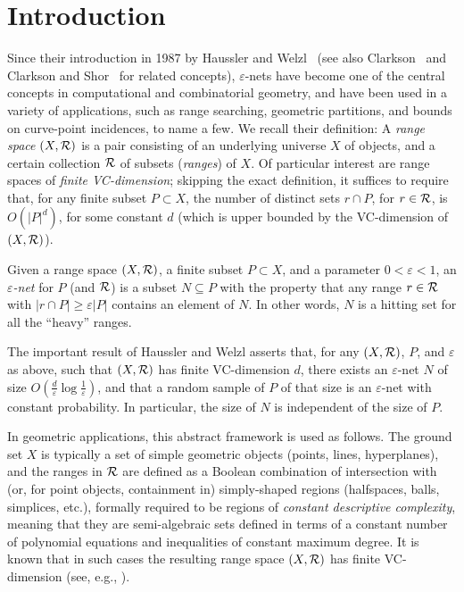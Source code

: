 \documentclass[12pt]{article}
\newcommand{\eps}{{\varepsilon}}
\def\R{{\cal R}}
\begin{document}
\section{Introduction}

Since their introduction in 1987 by Haussler and
Welzl~\cite{hw-ensrq-87} (see also Clarkson~\cite{c-narsc-87} and
Clarkson and Shor~\cite{cs-arscg-89} for related concepts),
$\eps$-nets have become one of the central concepts in computational
and combinatorial geometry, and have been used in a variety of
applications, such as range searching, geometric partitions, and
bounds on curve-point incidences, to name a few. We recall their
definition: A {\em range space} $(X,\R)$ is a pair consisting of an
underlying universe $X$ of objects, and a certain collection $\R$ of
subsets ({\em ranges}) of $X$. Of particular interest are range spaces
of {\em finite VC-dimension}; skipping the exact definition, it
suffices to require that, for any finite subset $P\subset X$, the
number of distinct sets $r\cap P$, for $r\in\R$, is $O(|P|^d)$, for
some constant $d$ (which is upper bounded by the VC-dimension of
$(X,\R)$).

Given a range space $(X,\R)$, a finite subset $P\subset X$, and a
parameter $0<\eps<1$, an {\em $\eps$-net} for $P$ (and $\R$) is a
subset $N\subseteq P$ with the property that any range $r\in\R$ with
$|r\cap P|\ge \eps|P|$ contains an element of $N$. In other words, $N$
is a hitting set for all the ``heavy'' ranges.

The important result of Haussler and Welzl asserts that, for any
$(X,\R)$, $P$, and $\eps$ as above, such that $(X,\R)$ has finite
VC-dimension $d$, there exists an $\eps$-net $N$ of size
$O\left(\frac{d}{\eps}\log\frac{1}{\eps}\right)$, and that a random
sample of $P$ of that size is an $\eps$-net with constant
probability. In particular, the size of $N$ is independent of the size
of $P$.

In geometric applications, this abstract framework is used as
follows. The ground set $X$ is typically a set of simple geometric
objects (points, lines, hyperplanes), and the ranges in $\R$ are
defined as a Boolean combination of intersection with (or, for point
objects, containment in) simply-shaped regions (halfspaces, balls,
simplices, etc.), formally required to be regions of {\em constant
   descriptive complexity}, meaning that they are semi-algebraic sets
defined in terms of a constant number of polynomial equations and
inequalities of constant maximum degree.  It is known that in such
cases the resulting range space $(X,\R)$ has finite VC-dimension (see,
e.g., \cite{m-ldg-02}).
\end{document}
